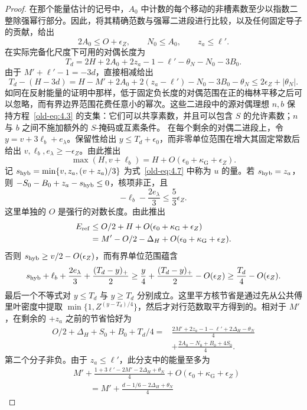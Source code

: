 \documentclass[11pt,a4paper]{article}
\numberwithin{equation}{section}
\numberwithin{figure}{section}
\theoremstyle{definition}
\theoremstyle{remark}
\begin{document}
\begin{proof}
在那个能量估计的记号中，$A_0$ 中计数的每个移动的非槽素数至少以指数二整除强幂行部分。因此，将其精确范数与强幂二进段进行比较，以及任何固定导子的贡献，给出
\[
 2A_0\le O+\epsilon_Z,\qquad N_0\le A_0,\qquad z_a\le\ell'.
\]
在实际完备化尺度下可用的对偶长度为
\[
 T_d=2H+2A_0+2z_a-1-\ell'-\theta_N-N_0-3B_0.
\]
由于 $M'+\ell'-1=-3d$，直接相减给出
\[
 T_d-(H-3d)
 =H-M'+2A_0+2(z_a-\ell')-N_0-3B_0-\theta_N
 \le 2\epsilon_Z+|\theta_N|.
\]
如同在反射能量的证明中那样，低于固定负长度的对偶范围在正的梅林平移之后可以忽略，而有界边界范围花费任意小的幂次。这些二进段中的源对偶理想 $n,b$ 保持方程~\eqref{old-eq:4.3} 的支集：它们可以共享素数，并且可以包含 $S$ 的允许素数；$n$ 与 $b$ 之间不施加额外的 $S$-掩码或互素条件。
在每个剩余的对偶二进段上，令 $y=v+3\ell_b+e_\lambda$。保留性给出 $y\le T_d+\epsilon_0$，而非零单位范围在增大其固定常数后给出 $v,\ell_b,e_\lambda\ge-\epsilon_Z$。由此推出
\[
 \max(H,v+\ell_b)=H+O(\epsilon_0+\kappa_{\mathrm G}+\epsilon_Z).
\]记 $s_{\rm hyb}=\min\{v,z_a,(v+z_a)/3\}$ 为式~\eqref{old-eq:4.7} 中称为 $u$ 的量。若 $s_{\rm hyb}=z_a$，则 $-S_0-B_0+z_a-s_{\rm hyb}\le0$，核项非正，且
\[
 -\ell_b-\frac{2e_\lambda}{3}\le\frac53\epsilon_Z.
\]
这里单独的 $O$ 是强行的对数长度。由此推出
\[
 \begin{aligned}
 E_{\rm ref}&\le O/2+H+O(\epsilon_0+\kappa_{\mathrm G}+\epsilon_Z)\\
 &=M'-O/2-\Delta_H+O(\epsilon_0+\kappa_{\mathrm G}+\epsilon_Z).
 \end{aligned}
\]
否则 $s_{\rm hyb}\ge v/2-O(\epsilon_Z)$，而有界单位范围蕴含
\[
 s_{\rm hyb}+\ell_b+\frac{2e_\lambda}{3}
       +\frac{(T_d-y)_+}{2}
 \ge \frac y4+\frac{(T_d-y)_+}{2}-O(\epsilon_Z)
 \ge \frac{T_d}{4}-O(\epsilon_Z).
\]
最后一个不等式对 $y\le T_d$ 与 $y\ge T_d$ 分别成立。这里平方核节省是通过先从公共傅里叶密度中提取 $\min\{1,Z^{(y-T_d)/4}\}$，然后才对行范数取平方得到的。相对于 $M'$，在剩余的 $+z_a$ 之前的节省恰好为
\begin{equation}
 \begin{split}
 O/2+\Delta_H+S_0+B_0+T_d/4
 ={}&\frac{2M'+2z_a-1-\ell'+2\Delta_H-\theta_N}{4}\\
    &+\frac{2A_0-N_0+B_0+4S_0}{4}.
 \end{split}
 \label{old-eq:5.3}
\end{equation}
第二个分子非负。由于 $z_a\le\ell'$，此分支中的能量至多为
\[
 \begin{aligned}
 &M'+\frac{1+3\ell'-2M'-2\Delta_H+\theta_N}{4}
       +O(\epsilon_0+\kappa_{\mathrm G}+\epsilon_Z)\\
 &\qquad=M'+\frac{d-1/6-2\Delta_H+\theta_N}{4}

\end{aligned}\]
\end{proof}
\end{document}
